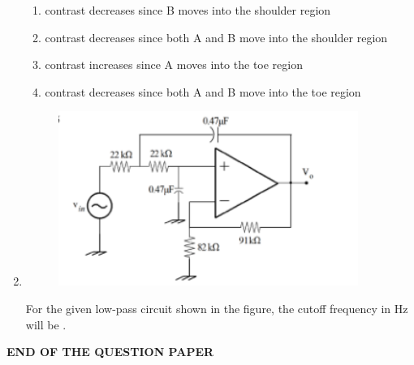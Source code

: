 \documentclass[journal,12pt,onecolumn]{IEEEtran}
\theoremstyle{remark}
\begin{document}
\begin{enumerate}
    \hfill{}
    \begin{enumerate}
        \item contrast decreases since B moves into the shoulder region
        \item contrast decreases since both A and B move into the shoulder region
        \item contrast increases since A moves into the toe region
        \item contrast decreases since both A and B move into the toe region
    \end{enumerate}

    

    \item
    \begin{figure}[H]
        \centering
        \includegraphics[width=0.6\columnwidth]{q55}
        \caption*{}
        \label{fig:q55}
    \end{figure}
    For the given low-pass circuit shown in the figure, the cutoff frequency in Hz will be \underline{\hspace{2cm}}.

    \hfill{}
    
\end{enumerate}

\begin{center}
    \textbf{END OF THE QUESTION PAPER}
\end{center}
\end{document}
